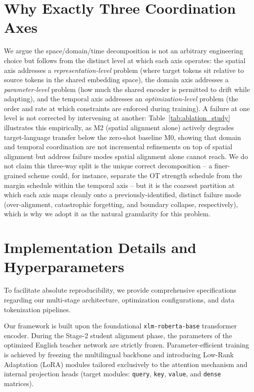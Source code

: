 \documentclass[11pt]{article}
\begin{document}
%



\appendix

\section{Why Exactly Three Coordination Axes}
\label{sec:appendix_three_axes}
We argue the space/domain/time decomposition is not an arbitrary engineering choice but follows from the distinct level at which each axis operates: the spatial axis addresses a \emph{representation-level} problem (where target tokens sit relative to source tokens in the shared embedding space), the domain axis addresses a \emph{parameter-level} problem (how much the shared encoder is permitted to drift while adapting), and the temporal axis addresses an \emph{optimization-level} problem (the order and rate at which constraints are enforced during training). A failure at one level is not corrected by intervening at another: Table~\ref{tab:ablation_study} illustrates this empirically, as M2 (spatial alignment alone) actively degrades target-language transfer below the zero-shot baseline M0, showing that domain and temporal coordination are not incremental refinements on top of spatial alignment but address failure modes spatial alignment alone cannot reach. We do not claim this three-way split is the unique correct decomposition -- a finer-grained scheme could, for instance, separate the OT strength schedule from the margin schedule within the temporal axis -- but it is the coarsest partition at which each axis maps cleanly onto a previously-identified, distinct failure mode (over-alignment, catastrophic forgetting, and boundary collapse, respectively), which is why we adopt it as the natural granularity for this problem.

\section{Implementation Details and Hyperparameters}
\label{sec:appendix_implementation}
To facilitate absolute reproducibility, we provide comprehensive specifications regarding our multi-stage architecture, optimization configurations, and data tokenization pipelines. 

Our framework is built upon the foundational \texttt{xlm-roberta-base} transformer encoder. During the Stage-2 student alignment phase, the parameters of the optimized English teacher network are strictly frozen. Parameter-efficient training is achieved by freezing the multilingual backbone and introducing Low-Rank Adaptation (LoRA) modules tailored exclusively to the attention mechanism and internal projection heads (target modules: \texttt{query}, \texttt{key}, \texttt{value}, and \texttt{dense} matrices). 
\end{document}

